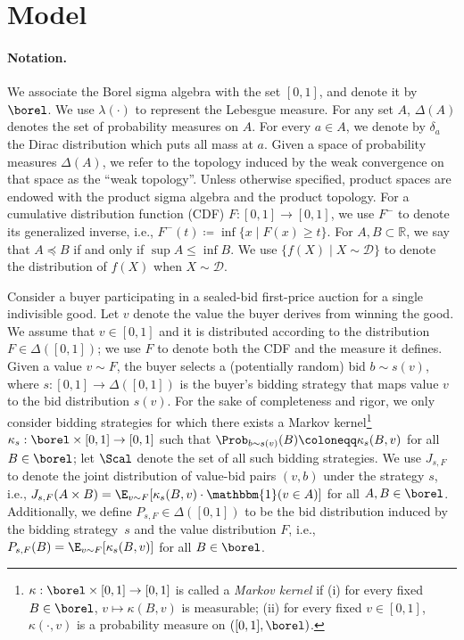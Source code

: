 \section{Model}\label{sec:model}

\paragraph{Notation.} We associate the Borel sigma algebra with the set $[0,1]$, and denote it by $\borel$. We use $\lambda(\cdot)$ to represent the Lebesgue measure.  For any set $A$, $\Delta \left( A \right)$ denotes the set of probability measures on $A$. For every $a \in A$, we denote by $\delta_a$ the Dirac distribution  which puts all mass at $a$. Given a space of probability measures $\Delta(A)$, we refer to the topology induced by the weak convergence on that space as the ``weak topology''. Unless otherwise specified, product spaces are endowed with the product sigma algebra and the product topology. For a cumulative distribution function (CDF) $F:[0,1] \to [0,1]$, we use $F^-$ to denote its generalized inverse, i.e., $F^-(t) \coloneqq \inf\{x \mid F(x) \geq t\}$. For $A,B \subset \mathbb{R}$, we say that $A \preccurlyeq B$ if and only if $\sup A \leq \inf B$. We use $\{f(X) \mid X \sim \mathcal D\}$ to denote the distribution of $f(X)$ when $X \sim \mathcal D$.

Consider a buyer participating in a sealed-bid first-price auction for a single indivisible good. Let $v$ denote the value the buyer derives from winning the good. We assume that $v \in [0,1]$ and it is distributed according to the distribution $F \in \Delta([0,1])$; we use $F$ to denote both the CDF and the measure it defines. Given a value ${v \sim F}$, the buyer selects a (potentially random) bid $b \sim s(v)$, where ${s: [0,1] \longrightarrow \Delta([0,1])}$ is the buyer's bidding strategy that maps value $v$ to the bid distribution $s(v)$. For the sake of completeness and rigor, we only consider bidding strategies for which there exists a Markov kernel\footnote{$\kappa: \borel \times [0,1] \to [0,1]$ is called a \emph{Markov kernel} if (i) for every fixed $B \in \borel$, $v \mapsto \kappa(B,v)$ is measurable; (ii) for every fixed $v \in [0,1]$, $\kappa(\cdot, v)$ is a probability measure on $([0,1], \borel)$.} ${\kappa_s:\borel \times [0,1] \to [0,1]}$ such that $\Prob_{b \sim s(v)}(B) \coloneqq \kappa_s(B, v)$ for all $B \in \borel$; let $\Scal$ denote the set of all such bidding strategies.
We use $J_{s,F}$ to denote the joint distribution of value-bid pairs $(v,b)$ under the strategy $s$, i.e., ${J_{s,F}(A \times B) = \E_{v \sim F}[\kappa_s(B,v) \cdot \mathbbm{1}(v \in A)]}$ for all $A,B \in \borel$. Additionally, we define $P_{s,F} \in \Delta([0,1])$ to be the bid distribution induced by the bidding strategy~$s$ and the value distribution $F$, i.e., $P_{s,F}(B) = \E_{v\sim F}[\kappa_s(B, v)]$ for all $B \in \borel$.

